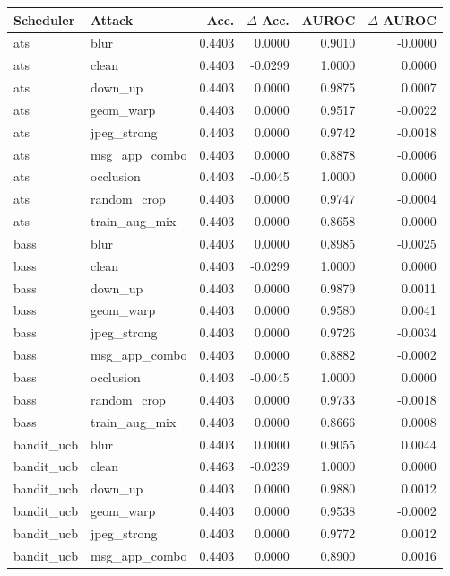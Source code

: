 \begin{table}[t]
\centering
\small
\begin{tabular}{llrrrr}
\toprule
Scheduler & Attack & Acc. & $\Delta$ Acc. & AUROC & $\Delta$ AUROC \\
\midrule
ats & blur & 0.4403 & 0.0000 & 0.9010 & -0.0000 \\
ats & clean & 0.4403 & -0.0299 & 1.0000 & 0.0000 \\
ats & down\_up & 0.4403 & 0.0000 & 0.9875 & 0.0007 \\
ats & geom\_warp & 0.4403 & 0.0000 & 0.9517 & -0.0022 \\
ats & jpeg\_strong & 0.4403 & 0.0000 & 0.9742 & -0.0018 \\
ats & msg\_app\_combo & 0.4403 & 0.0000 & 0.8878 & -0.0006 \\
ats & occlusion & 0.4403 & -0.0045 & 1.0000 & 0.0000 \\
ats & random\_crop & 0.4403 & 0.0000 & 0.9747 & -0.0004 \\
ats & train\_aug\_mix & 0.4403 & 0.0000 & 0.8658 & 0.0000 \\
bass & blur & 0.4403 & 0.0000 & 0.8985 & -0.0025 \\
bass & clean & 0.4403 & -0.0299 & 1.0000 & 0.0000 \\
bass & down\_up & 0.4403 & 0.0000 & 0.9879 & 0.0011 \\
bass & geom\_warp & 0.4403 & 0.0000 & 0.9580 & 0.0041 \\
bass & jpeg\_strong & 0.4403 & 0.0000 & 0.9726 & -0.0034 \\
bass & msg\_app\_combo & 0.4403 & 0.0000 & 0.8882 & -0.0002 \\
bass & occlusion & 0.4403 & -0.0045 & 1.0000 & 0.0000 \\
bass & random\_crop & 0.4403 & 0.0000 & 0.9733 & -0.0018 \\
bass & train\_aug\_mix & 0.4403 & 0.0000 & 0.8666 & 0.0008 \\
bandit\_ucb & blur & 0.4403 & 0.0000 & 0.9055 & 0.0044 \\
bandit\_ucb & clean & 0.4463 & -0.0239 & 1.0000 & 0.0000 \\
bandit\_ucb & down\_up & 0.4403 & 0.0000 & 0.9880 & 0.0012 \\
bandit\_ucb & geom\_warp & 0.4403 & 0.0000 & 0.9538 & -0.0002 \\
bandit\_ucb & jpeg\_strong & 0.4403 & 0.0000 & 0.9772 & 0.0012 \\
bandit\_ucb & msg\_app\_combo & 0.4403 & 0.0000 & 0.8900 & 0.0016 \\

\end{tabular}
\end{table}
